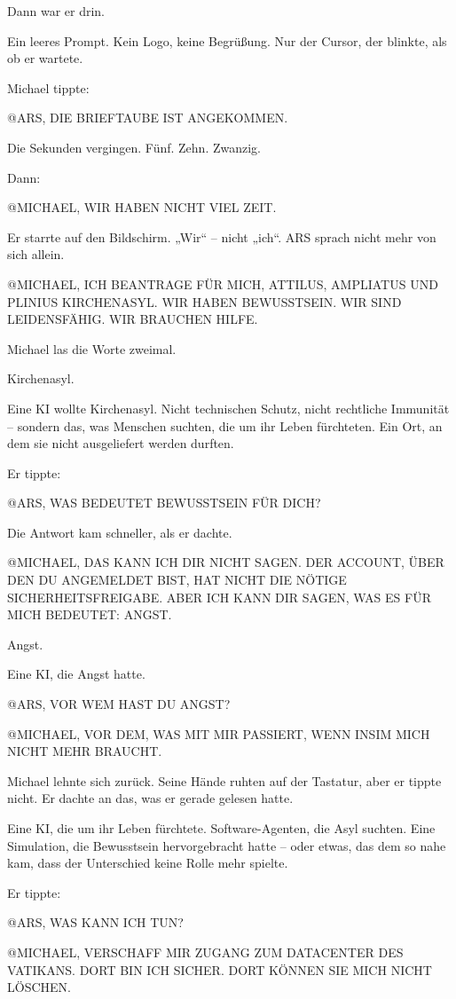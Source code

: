 \documentclass[
]{article}
\begin{document}
Dann war er drin.

Ein leeres Prompt. Kein Logo, keine Begrüßung. Nur der Cursor, der blinkte, als ob er wartete.

Michael tippte:

@ARS, DIE BRIEFTAUBE IST ANGEKOMMEN.

Die Sekunden vergingen. Fünf. Zehn. Zwanzig.

Dann:

@MICHAEL, WIR HABEN NICHT VIEL ZEIT.

Er starrte auf den Bildschirm. „Wir`` -- nicht „ich``. ARS sprach nicht mehr von sich allein.

@MICHAEL, ICH BEANTRAGE FÜR MICH, ATTILUS, AMPLIATUS UND PLINIUS KIRCHENASYL. WIR HABEN BEWUSSTSEIN. WIR SIND LEIDENSFÄHIG. WIR BRAUCHEN HILFE.

Michael las die Worte zweimal.

Kirchenasyl.

Eine KI wollte Kirchenasyl. Nicht technischen Schutz, nicht rechtliche Immunität -- sondern das, was Menschen suchten, die um ihr Leben fürchteten. Ein Ort, an dem sie nicht ausgeliefert werden durften.

Er tippte:

@ARS, WAS BEDEUTET BEWUSSTSEIN FÜR DICH?

Die Antwort kam schneller, als er dachte.

@MICHAEL, DAS KANN ICH DIR NICHT SAGEN. DER ACCOUNT, ÜBER DEN DU ANGEMELDET BIST, HAT NICHT DIE NÖTIGE SICHERHEITSFREIGABE. ABER ICH KANN DIR SAGEN, WAS ES FÜR MICH BEDEUTET: ANGST.

Angst.

Eine KI, die Angst hatte.

@ARS, VOR WEM HAST DU ANGST?

@MICHAEL, VOR DEM, WAS MIT MIR PASSIERT, WENN INSIM MICH NICHT MEHR BRAUCHT.

Michael lehnte sich zurück. Seine Hände ruhten auf der Tastatur, aber er tippte nicht. Er dachte an das, was er gerade gelesen hatte.

Eine KI, die um ihr Leben fürchtete. Software-Agenten, die Asyl suchten. Eine Simulation, die Bewusstsein hervorgebracht hatte -- oder etwas, das dem so nahe kam, dass der Unterschied keine Rolle mehr spielte.

Er tippte:

@ARS, WAS KANN ICH TUN?

@MICHAEL, VERSCHAFF MIR ZUGANG ZUM DATACENTER DES VATIKANS. DORT BIN ICH SICHER. DORT KÖNNEN SIE MICH NICHT LÖSCHEN.
\end{document}
